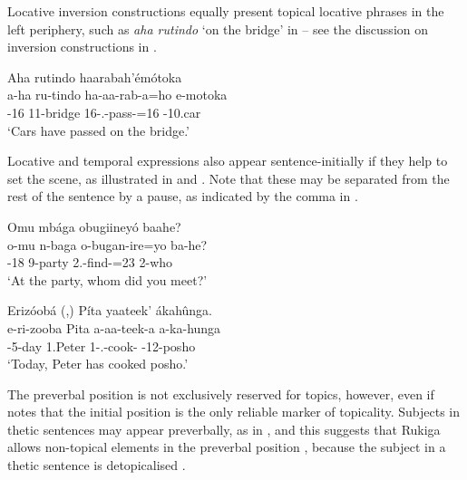\documentclass[output=paper]{langscibook}
\begin{document}
\z


Locative inversion constructions equally present topical locative phrases in the left periphery, such as \textit{aha rutindo} ‘on the bridge’ in  – see the discussion on inversion constructions in .

\ea
\nolistbreak
\label{bkm:Ref111449185}
Aha rutindo haarabah’émótoka\\
\gll
a-ha  ru-tindo  ha-aa-rab-a=ho  e-motoka\\
\AUG{}-16  11-bridge  16\SM{}-\N{}.\PST{}-{}pass-\FV{}=16  \AUG{}-10.car\\
\glt
‘Cars have passed on the bridge.’\\


\z


Locative and temporal expressions also appear sentence-initially if they help to set the scene, as illustrated in  and . Note that these may be separated from the rest of the sentence by a pause, as indicated by the comma in .

\ea
\label{bkm:Ref116291272}
Omu mbága obugiineyó baahe?\\
\gll
o-mu  n-baga  o-bugan-ire=yo  ba-he?\\
\AUG{}-18  9-party  2\SG{}.\SM{}-find-\PFV{}=23{}  2-who\\
\glt
‘At the party, whom did you meet?’\\


\z

\ea
\label{bkm:Ref116291274}
Erizóobá (,) Píta yaateek’ ákahûnga.\\
\gll
e-ri-zooba  Pita  a-aa-teek-a  a-ka-hunga\\
\AUG{}-5-day  1.Peter  1\SM{}-\N{}.\PST{}-cook-\FV{}  \AUG{}-12-posho\\
\glt
‘Today, Peter has cooked posho.’\\


\z

The preverbal position is not exclusively reserved for topics, however, even if \citet[79]{Taylor1985} notes that the initial position is the only reliable marker of topicality. Subjects in thetic sentences may appear preverbally, as in , and this suggests that Rukiga allows non-topical elements in the preverbal position \citep{KerrEtAl2023}, because the subject in a thetic sentence is detopicalised \citep{Sasse1996,Lambrecht1994}.
\end{document}
